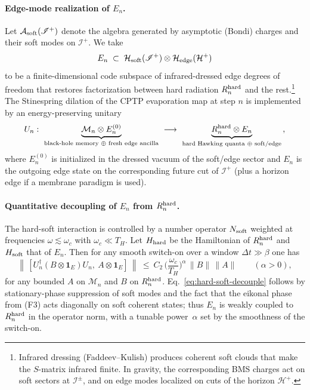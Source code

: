 \paragraph{Edge-mode realization of $E_n$.}
Let $\mathcal{A}_{\rm soft}(\mathscr{I}^+)$ denote the algebra generated by asymptotic (Bondi) charges and their soft modes on $\mathscr{I}^+$. We take
\[
  E_n \;\subset\; \mathcal{H}_{\rm soft}(\mathscr{I}^+)\otimes \mathcal{H}_{\rm edge}(\mathcal{H}^+)
\]
to be a finite-dimensional code subspace of infrared-dressed edge degrees of freedom that restores factorization between hard radiation $R_n^{\rm hard}$ and the rest.\footnote{Infrared dressing (Faddeev--Kulish) produces coherent soft clouds that make the $S$-matrix infrared finite. In gravity, the corresponding BMS charges act on soft sectors at $\mathscr{I}^\pm$, and on edge modes localized on cuts of the horizon $\mathcal{H}^+$.} The Stinespring dilation of the CPTP evaporation map at step $n$ is implemented by an energy-preserving unitary
\[
  U_n:\ 
  \underbrace{\mathcal{M}_n\otimes E_n^{(0)}}_{\text{black-hole memory $\oplus$ fresh edge ancilla}}
  \ \longrightarrow\
  \underbrace{R_n^{\rm hard}\otimes E_n}_{\text{hard Hawking quanta $\oplus$ soft/edge}}
  \,,
\]
where $E_n^{(0)}$ is initialized in the dressed vacuum of the soft/edge sector and $E_n$ is the outgoing edge state on the corresponding future cut of $\mathscr{I}^+$ (plus a horizon edge if a membrane paradigm is used).

\paragraph{Quantitative decoupling of $E_n$ from $R_n^{\rm hard}$.}
The hard-soft interaction is controlled by a number operator $N_{\rm soft}$ weighted at frequencies $\omega\!\lesssim\!\omega_c$ with $\omega_c\ll T_H$. Let $H_{\rm hard}$ be the Hamiltonian of $R_n^{\rm hard}$ and $H_{\rm soft}$ that of $E_n$. Then for any smooth switch-on over a window $\Delta t\gg \beta$ one has
\begin{equation}
  \left\|\,[U_n^\dagger (B\otimes \mathbf{1}_{E}) U_n,\ A\otimes \mathbf{1}_{E}]\,\right\|
  \ \le\ C_2\,\Big(\frac{\omega_c}{T_H}\Big)^{\!\alpha}\, \|B\|\,\|A\|
  \qquad (\alpha>0),
  \label{eq:hard-soft-decouple}
\end{equation}
for any bounded $A$ on $\mathcal{M}_n$ and $B$ on $R_n^{\rm hard}$.
Eq.~\eqref{eq:hard-soft-decouple} follows by stationary-phase suppression of soft modes and the fact that the eikonal phase from (F3) acts diagonally on soft coherent states; thus $E_n$ is weakly coupled to $R_n^{\rm hard}$ in the operator norm, with a tunable power~$\alpha$ set by the smoothness of the switch-on.


